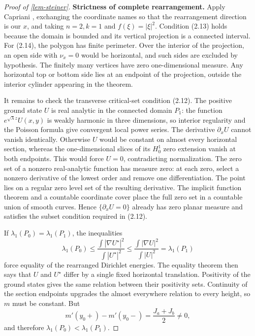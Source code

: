 \documentclass[11pt,a4paper]{article}
\theoremstyle{proofmanuscript}
\begin{document}
\begin{proof}[Proof of \ref{lem-steiner}]
\textbf{Strictness of complete rearrangement.} Apply Capriani \cite{nc:Capriani}, exchanging the coordinate names so that the rearrangement direction is our \(x\), and taking \(n=2,k=1\) and \(f(\xi)=|\xi|^2\). Condition (2.13) holds because the domain is bounded and its vertical projection is a connected interval. For (2.14), the polygon has finite perimeter. Over the interior of the projection, an open side with \(\nu_x=0\) would be horizontal, and such sides are excluded by hypothesis. The finitely many vertices have zero one-dimensional measure. Any horizontal top or bottom side lies at an endpoint of the projection, outside the interior cylinder appearing in the theorem.

It remains to check the transverse critical-set condition (2.12). The positive ground state \(U\) is real analytic in the connected domain \(P_1\): the function \(e^{\sqrt\lambda z}U(x,y)\) is weakly harmonic in three dimensions, so interior regularity and the Poisson formula give convergent local power series. The derivative \(\partial_xU\) cannot vanish identically. Otherwise \(U\) would be constant on almost every horizontal section, whereas the one-dimensional slices of its \(H_0^1\) zero extension vanish at both endpoints. This would force \(U=0\), contradicting normalization. The zero set of a nonzero real-analytic function has measure zero: at each zero, select a nonzero derivative of the lowest order and remove one differentiation. The point lies on a regular zero level set of the resulting derivative. The implicit function theorem and a countable coordinate cover place the full zero set in a countable union of smooth curves. Hence \(\{\partial_xU=0\}\) already has zero planar measure and satisfies the subset condition required in (2.12).

If \(\lambda_1(P_0)=\lambda_1(P_1)\), the inequalities \[
\lambda_1(P_0)
\le\frac{\int|\nabla U^\star|^2}{\int|U^\star|^2}
\le\frac{\int|\nabla U|^2}{\int|U|^2}
=\lambda_1(P_1)
\] force equality of the rearranged Dirichlet energies. The equality theorem then says that \(U\) and \(U^\star\) differ by a single fixed horizontal translation. Positivity of the ground states gives the same relation between their positivity sets. Continuity of the section endpoints upgrades the almost everywhere relation to every height, so \(m\) must be constant. But \[
m'(y_0+)-m'(y_0-)=\frac{J_a+J_b}{2}\ne0,
\] and therefore \(\lambda_1(P_0)<\lambda_1(P_1)\).


\end{proof}
\end{document}
